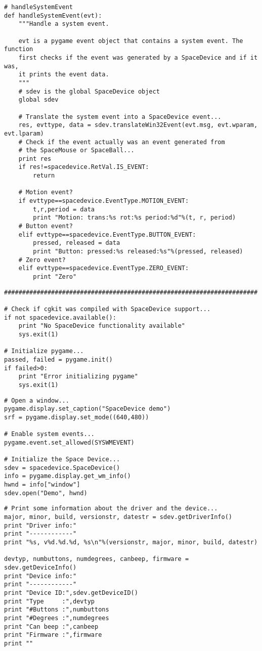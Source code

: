\begin{verbatim}
# handleSystemEvent
def handleSystemEvent(evt):
    """Handle a system event.

    evt is a pygame event object that contains a system event. The function
    first checks if the event was generated by a SpaceDevice and if it was,
    it prints the event data.
    """
    # sdev is the global SpaceDevice object
    global sdev
    
    # Translate the system event into a SpaceDevice event...
    res, evttype, data = sdev.translateWin32Event(evt.msg, evt.wparam, evt.lparam)
    # Check if the event actually was an event generated from
    # the SpaceMouse or SpaceBall...
    print res
    if res!=spacedevice.RetVal.IS_EVENT:
        return

    # Motion event?
    if evttype==spacedevice.EventType.MOTION_EVENT:
        t,r,period = data
        print "Motion: trans:%s rot:%s period:%d"%(t, r, period)
    # Button event?
    elif evttype==spacedevice.EventType.BUTTON_EVENT:
        pressed, released = data
        print "Button: pressed:%s released:%s"%(pressed, released)
    # Zero event?
    elif evttype==spacedevice.EventType.ZERO_EVENT:
        print "Zero"
\end{verbatim}    

\begin{verbatim}
######################################################################

# Check if cgkit was compiled with SpaceDevice support...
if not spacedevice.available():
    print "No SpaceDevice functionality available"
    sys.exit(1)
    
# Initialize pygame...
passed, failed = pygame.init()
if failed>0:
    print "Error initializing pygame"
    sys.exit(1)
\end{verbatim}

\begin{verbatim}
# Open a window...
pygame.display.set_caption("SpaceDevice demo")
srf = pygame.display.set_mode((640,480))

# Enable system events...
pygame.event.set_allowed(SYSWMEVENT)

# Initialize the Space Device...
sdev = spacedevice.SpaceDevice()
info = pygame.display.get_wm_info()
hwnd = info["window"]
sdev.open("Demo", hwnd)
\end{verbatim}

\begin{verbatim}
# Print some information about the driver and the device...
major, minor, build, versionstr, datestr = sdev.getDriverInfo()
print "Driver info:"
print "------------"
print "%s, v%d.%d.%d, %s\n"%(versionstr, major, minor, build, datestr)

devtyp, numbuttons, numdegrees, canbeep, firmware = sdev.getDeviceInfo()
print "Device info:"
print "------------"
print "Device ID:",sdev.getDeviceID()
print "Type     :",devtyp
print "#Buttons :",numbuttons
print "#Degrees :",numdegrees
print "Can beep :",canbeep
print "Firmware :",firmware
print ""
\end{verbatim}

